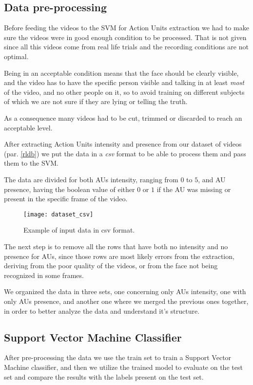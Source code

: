 \subsection{Data pre-processing}
Before feeding the videos to the SVM for Action Units extraction we had to make sure the videos were in good enough condition to be processed. That is not given since all this videos come from real life trials and the recording conditions are not optimal.

Being in an acceptable condition means that the face should be clearly visible, and the video has to have the specific person visible and talking in at least \textit{most} of the video, and no other people on it, so to avoid training on different subjects of which we are not sure if they are lying or telling the truth.

As a consequence many videos had to be cut, trimmed or discarded to reach an acceptable level.

After extracting Action Units intensity and presence from our dataset of videos (par. \ref{rldb}) we put the data in a \textit{csv} format to be able to process them and pass them to the SVM. 

The data are divided for both AUs intensity, ranging from $0$ to $5$, and AU presence, having the boolean value of either $0$ or $1$ if the AU was missing or present in the specific frame of the video.

\begin{figure}[H]
	\centering
	\texttt{[image: dataset\_csv]}
	\caption{Example of input data in csv format.}
	\label{fig:dataset_csv}
\end{figure}

The next step is to remove all the rows that have both no intensity and no presence for AUs, since those rows are most likely errors from the extraction, deriving from the poor quality of the videos, or from the face not being recognized in some frames.

We organized the data in three sets, one concerning only AUs intensity, one with only AUs presence, and another one where we merged the previous ones together, in order to better analyze the data and understand it's structure.

\subsection{Support Vector Machine Classifier}
After pre-processing the data we use the train set to train a Support Vector Machine classifier, and then we utilize the trained model to evaluate on the test set and compare the results with the labels present on the test set.

